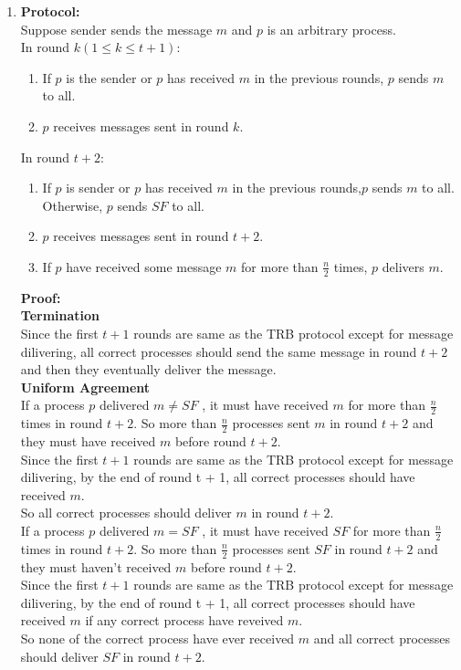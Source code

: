 \documentclass[12pt]{article}
\begin{document}
\begin{enumerate}
\item
\textbf{\large Protocol:}\\

Suppose sender sends the message $m$ and $p$ is an arbitrary process.\\
In round $k(1\leq k\leq t+1)$:
\begin{enumerate}
\item If $p$ is the sender or $p$ has received $m$ in the previous rounds, $p$ sends $m$ to all.
\item $p$ receives messages sent in round $k$.\\
\end{enumerate}
In round $t + 2$:
\begin{enumerate}
\item If $p$ is sender or $p$ has received $m$ in the previous rounds,$p$ sends $m$ to all. Otherwise, $p$ sends $SF$ to all.
\item $p$ receives messages sent in round $t+2$.
\item If $p$ have received some message $m$ for more than $\frac{n}{2}$ times, $p$ delivers $m$.
\end{enumerate}
\newpage
\textbf{\large Proof:}\\

\textbf{Termination}\\

Since the first $t+1$ rounds are same as the TRB protocol except for message dilivering, all correct processes should send the same message in round $t+2$ and then they eventually deliver the message.\\

\textbf{Uniform Agreement}\\

If a process $p$ delivered $m\neq SF$ , it must have received $m$ for more than $\frac{n}{2}$ times in round $t + 2$. So more than $\frac{n}{2}$ processes sent $m$ in round $t+2$ and they must have received $m$ before round $t+2$.\\
Since the first $t+1$ rounds are same as the TRB protocol except for message dilivering, by the end of round t + 1, all correct processes should have received $m$.\\
So all correct processes should deliver $m$ in round $t + 2$.\\

If a process $p$ delivered $m=SF$ , it must have received $SF$ for more than $\frac{n}{2}$ times in round $t + 2$. So more than $\frac{n}{2}$ processes sent $SF$ in round $t+2$ and they must haven't received $m$ before round $t+2$.\\
Since the first $t+1$ rounds are same as the TRB protocol except for message dilivering, by the end of round t + 1, all correct processes should have received $m$ if any correct process have reveived $m$.\\
So none of the correct process have ever received $m$ and all correct processes should deliver $SF$ in round $t + 2$.\\


\end{enumerate}
\end{document}
